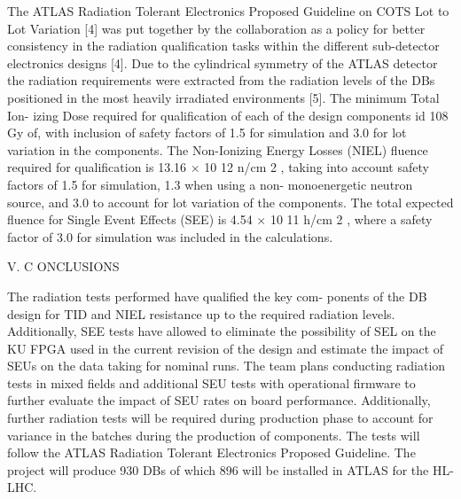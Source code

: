 \documentclass{article}
\begin{document}
The 
ATLAS 
Radiation 
Tolerant 
Electronics 
Proposed 
Guideline   on   COTS   Lot   to   Lot   Variation   [4]   was   put   together 
by   the   collaboration   as   a   policy   for   better   consistency   in   the 
radiation   qualification   tasks   within   the   different   sub-detector 
electronics   designs   [4].   Due   to   the   cylindrical   symmetry   of 
the ATLAS detector the radiation requirements were extracted 
from   the   radiation   levels   of   the   DBs   positioned   in   the   most 
heavily   irradiated   environments   [5].   The   minimum   Total   Ion- 
izing   Dose   required   for   qualification   of   each   of   the   design 
components   id   108   Gy   of,   with   inclusion   of   safety   factors   of 
1.5   for   simulation   and   3.0   for   lot   variation   in   the   components. 
The   Non-Ionizing   Energy   Losses   (NIEL)   fluence   required 
for   qualification   is   13.16   $\times$   10 12   n/cm 2 ,   taking   into   account 
safety   factors   of   1.5   for   simulation,   1.3   when   using   a   non- 
monoenergetic   neutron   source,   and   3.0   to   account   for   lot 
variation   of   the   components.   The   total   expected   fluence   for 
Single   Event   Effects   (SEE)   is   4.54   $\times$   10 11   h/cm 2   ,   where 
a   safety   factor   of   3.0   for   simulation   was   included   in   the 
calculations.

V.   C ONCLUSIONS

The   radiation   tests   performed   have   qualified   the   key   com- 
ponents   of   the   DB   design   for   TID   and   NIEL   resistance   up 
to   the   required   radiation   levels.   Additionally,   SEE   tests   have 
allowed   to   eliminate   the   possibility   of   SEL   on   the   KU   FPGA 
used   in   the   current   revision   of   the   design   and   estimate   the 
impact of SEUs on the data taking for nominal runs. The team 
plans   conducting   radiation   tests   in   mixed   fields   and   additional 
SEU   tests   with   operational   firmware   to   further   evaluate   the 
impact   of   SEU   rates   on   board   performance.   Additionally, 
further radiation tests will be required during production phase 
to   account   for   variance   in   the   batches   during   the   production 
of   components.   The   tests   will   follow   the   ATLAS   Radiation 
Tolerant   Electronics   Proposed   Guideline.   The   project   will 
produce   930   DBs   of   which   896   will   be   installed   in   ATLAS 
for   the   HL-LHC.
\end{document}
